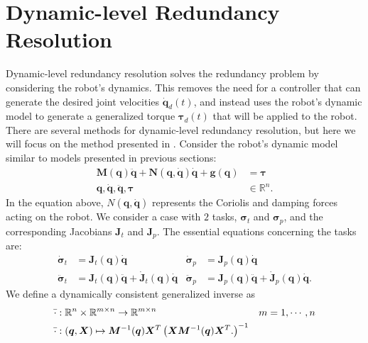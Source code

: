 \newpage
\section{Dynamic-level Redundancy Resolution}
\label{sec:tpc:dynamic_level}

Dynamic-level redundancy resolution solves the redundancy problem by considering
the robot's dynamics. This removes the need for a controller that can generate
the desired joint velocities $\dot{\bm{q}}_d(t)$, and instead uses the robot's
dynamic model to generate a generalized torque $\bm{\tau}_d(t)$ that will
be applied to the robot. There are several methods for dynamic-level redundancy
resolution, but here we will focus on the method presented in \cite{khatib2004}.
Consider the robot's dynamic model similar to models presented in previous sections:
\begin{subequations}
\begin{align}
    \bm{M}(\bm{q}) \ddot{\bm{q}} + \bm{N}(\bm{q}, \dot{\bm{q}}) \dot{\bm{q}} + \bm{g}(\bm{q}) &= \bm{\tau} \\
    \bm{q}, \dot{\bm{q}} ,\ddot{\bm{q}},\bm{\tau} &\in \mathbb{R}^n.
\end{align}
\end{subequations}
In the equation above, $N(\bm{q}, \dot{\bm{q}})$ represents the Coriolis and
damping forces acting on the robot. We consider a case with $2$ tasks, $\bm{\sigma}_t$
and $\bm{\sigma}_p$, and the corresponding Jacobians $\bm{J}_t$ and $\bm{J}_p$.
The essential equations concerning the tasks are:
\begin{subequations}
    \begin{align}
        \dot{\bm{\sigma}}_t &= \bm{J}_t(\bm{q}) \dot{\bm{q}} & \dot{\bm{\sigma}}_p &= \bm{J}_p(\bm{q}) \dot{\bm{q}} \\
        \ddot{\bm{\sigma}}_t &= \bm{J}_t(\bm{q}) \ddot{\bm{q}} + \dot{\bm{J}}_t(\bm{q}) \dot{\bm{q}} &
        \ddot{\bm{\sigma}}_p &= \bm{J}_p(\bm{q}) \ddot{\bm{q}} + \dot{\bm{J}}_p(\bm{q}) \dot{\bm{q}}.
    \end{align}
\end{subequations}
We define a dynamically consistent generalized inverse \cite{khatib1987} as
\begin{subequations}
    \begin{align}
        \bar{\cdot} &: \mathbb{R}^n \times \mathbb{R}^{m\times n} \rightarrow \mathbb{R}^{m\times n} & m &= 1, \cdots, n\\
        \bar{\cdot} &: (\bm{q},\bm{X}) \mapsto \bm{M}^{-1}(\bm{q})\bm{X}^T\left(
            \bm{X}\bm{M}^{-1}(\bm{q})\bm{X}^T.
        \right)^{-1}
    \end{align}
\end{subequations}
